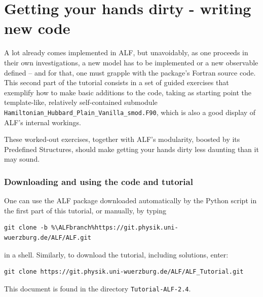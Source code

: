 \documentclass[10pt,modern]{scrartcl}
\numberwithin{exerciseitem}{exercise} %
\newcommand{\ALFver}{2.4}          %
\newcommand{\ALFbranch}{ALF-2.4}   %
\newcommand{\tutALFver}{2.4}       %
\begin{document}











\newpage

\part{Getting your hands dirty - writing new code}

A lot already comes implemented in ALF, but unavoidably, as one proceeds in their own investigations, a new model has to be implemented or a new observable defined -- and for that, one must grapple with the package's Fortran source code. 
This second part of the tutorial consists in a set of guided exercises that exemplify how to make basic additions to the code, taking as starting point the template-like, relatively self-contained submodule \texttt{Hamiltonian\_Hubbard\_Plain\_Vanilla\_smod.F90}, which is also a good display of ALF's internal workings.

These worked-out exercises, together with ALF's modularity, boosted by its Predefined Structures, should make getting your hands dirty less daunting than it may sound.


\section*{Downloading and using the code and tutorial}
One can use the ALF package downloaded automatically by the Python script in the first part of this tutorial, or manually, by typing
\begin{lstlisting}[style=bash,escapechar=\%]
git clone -b %\ALFbranch%https://git.physik.uni-wuerzburg.de/ALF/ALF.git
\end{lstlisting}
in a shell. Similarly, to download the tutorial, including solutions, enter:
\begin{lstlisting}[style=bash]
git clone https://git.physik.uni-wuerzburg.de/ALF/ALF_Tutorial.git
\end{lstlisting}
This document is found in the directory \texttt{Tutorial-ALF-\tutALFver{}}.
\end{document}
